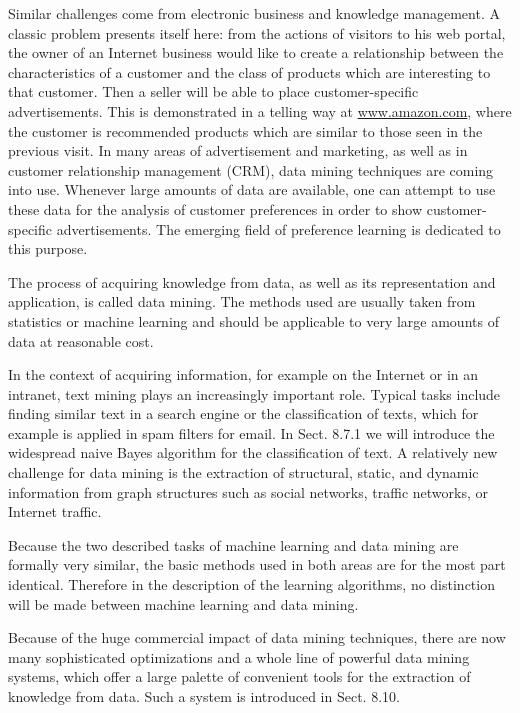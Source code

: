 \documentclass[10pt]{book}
\begin{document}
Similar challenges come from electronic business and knowledge management. A classic problem presents itself here: from the actions of visitors to his web portal, the owner of an Internet business would like to create a relationship between the characteristics of a customer and the class of products which are interesting to that customer. Then a seller will be able to place customer-specific advertisements. This is demonstrated in a telling way at \href{http://www.amazon.com}{www.amazon.com}, where the customer is recommended products which are similar to those seen in the previous visit. In many areas of advertisement and marketing, as well as in customer relationship management (CRM), data mining techniques are coming into use. Whenever large amounts of data are available, one can attempt to use these data for the analysis of customer preferences in order to show customer-specific advertisements. The emerging field of preference learning is dedicated to this purpose.

The process of acquiring knowledge from data, as well as its representation and application, is called data mining. The methods used are usually taken from statistics or machine learning and should be applicable to very large amounts of data at reasonable cost.

In the context of acquiring information, for example on the Internet or in an intranet, text mining plays an increasingly important role. Typical tasks include finding similar text in a search engine or the classification of texts, which for example is applied in spam filters for email. In Sect. 8.7.1 we will introduce the widespread naive Bayes algorithm for the classification of text. A relatively new challenge for data mining is the extraction of structural, static, and dynamic information from graph structures such as social networks, traffic networks, or Internet traffic.

Because the two described tasks of machine learning and data mining are formally very similar, the basic methods used in both areas are for the most part identical. Therefore in the description of the learning algorithms, no distinction will be made between machine learning and data mining.

Because of the huge commercial impact of data mining techniques, there are now many sophisticated optimizations and a whole line of powerful data mining systems, which offer a large palette of convenient tools for the extraction of knowledge from data. Such a system is introduced in Sect. 8.10.
\end{document}
